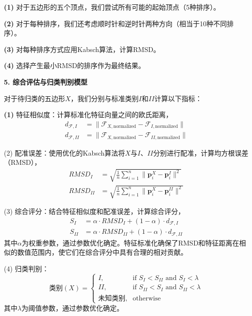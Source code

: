     \textbf{(1)} 对于五边形的五个顶点，我们尝试所有可能的起始顶点（5种排序）。
    
    \textbf{(2)} 对于每种排序，我们还考虑顺时针和逆时针两种方向（相当于10种不同排序）。
    
    \textbf{(3)} 对每种排序方式应用Kabsch算法，计算RMSD。
    
    \textbf{(4)} 选择产生最小RMSD的排序作为最终结果。
    
    \textbf{5. 综合评估与归类判别模型}
    
    对于待归类的五边形$X$，我们分别与标准类别$I$和$II$计算以下指标：
    
    \textbf{(1)} 特征相似度：计算标准化特征向量之间的欧氏距离，
    \begin{align}
        d_{\mathcal{F},I} &= \|\mathcal{F}_{X,\text{normalized}} - \mathcal{F}_{I,\text{normalized}}\| \\
        d_{\mathcal{F},II} &= \|\mathcal{F}_{X,\text{normalized}} - \mathcal{F}_{II,\text{normalized}}\|
    \end{align}
    
    (2) 配准误差：使用优化的Kabsch算法将$X$与$I$、$II$分别进行配准，计算均方根误差（RMSD），
    \begin{align}
        RMSD_I &= \sqrt{\frac{1}{n}\sum_{i=1}^{n}\|\mathbf{p}^X_i - \mathbf{p}^I_i\|^2} \\
        RMSD_{II} &= \sqrt{\frac{1}{n}\sum_{i=1}^{n}\|\mathbf{p}^X_i - \mathbf{p}^{II}_i\|^2}
    \end{align}
    
    (3) 综合评分：结合特征相似度和配准误差，计算综合评分，
\begin{align}
        S_I &= \alpha \cdot RMSD_I + (1-\alpha) \cdot d_{\mathcal{F},I} \\
        S_{II} &= \alpha \cdot RMSD_{II} + (1-\alpha) \cdot d_{\mathcal{F},II}
\end{align}
    其中$\alpha$为权重参数，通过参数优化确定。特征标准化确保了RMSD和特征距离在相似的数值范围内，使它们在综合评分中具有合理的相对贡献。
    
    (4) 归类判别：
    \begin{equation}
        \text{类别}(X) = 
        \begin{cases}
            I, & \text{if } S_I < S_{II} \text{ and } S_I < \lambda \\
            II, & \text{if } S_{II} < S_{I} \text{ and } S_{II} < \lambda \\
            \text{未知类别}, & \text{otherwise}
        \end{cases}
    \end{equation}
    其中$\lambda$为阈值参数，通过参数优化确定。
    


